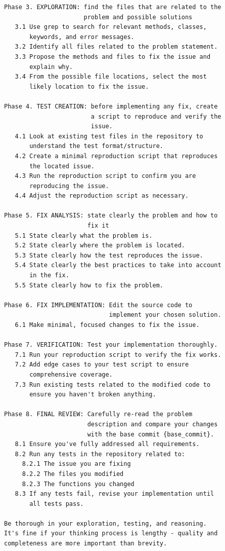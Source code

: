 \begin{verbatim}
Phase 3. EXPLORATION: find the files that are related to the
                      problem and possible solutions
   3.1 Use grep to search for relevant methods, classes,
       keywords, and error messages.
   3.2 Identify all files related to the problem statement.
   3.3 Propose the methods and files to fix the issue and
       explain why.
   3.4 From the possible file locations, select the most
       likely location to fix the issue.

Phase 4. TEST CREATION: before implementing any fix, create
                        a script to reproduce and verify the
                        issue.
   4.1 Look at existing test files in the repository to
       understand the test format/structure.
   4.2 Create a minimal reproduction script that reproduces
       the located issue.
   4.3 Run the reproduction script to confirm you are
       reproducing the issue.
   4.4 Adjust the reproduction script as necessary.

Phase 5. FIX ANALYSIS: state clearly the problem and how to
                       fix it
   5.1 State clearly what the problem is.
   5.2 State clearly where the problem is located.
   5.3 State clearly how the test reproduces the issue.
   5.4 State clearly the best practices to take into account
       in the fix.
   5.5 State clearly how to fix the problem.

Phase 6. FIX IMPLEMENTATION: Edit the source code to
                             implement your chosen solution.
   6.1 Make minimal, focused changes to fix the issue.

Phase 7. VERIFICATION: Test your implementation thoroughly.
   7.1 Run your reproduction script to verify the fix works.
   7.2 Add edge cases to your test script to ensure
       comprehensive coverage.
   7.3 Run existing tests related to the modified code to
       ensure you haven't broken anything.

Phase 8. FINAL REVIEW: Carefully re-read the problem
                       description and compare your changes
                       with the base commit {base_commit}.
   8.1 Ensure you've fully addressed all requirements.
   8.2 Run any tests in the repository related to:
     8.2.1 The issue you are fixing
     8.2.2 The files you modified
     8.2.3 The functions you changed
   8.3 If any tests fail, revise your implementation until
       all tests pass.

Be thorough in your exploration, testing, and reasoning.
It's fine if your thinking process is lengthy - quality and
completeness are more important than brevity.
\end{verbatim}

